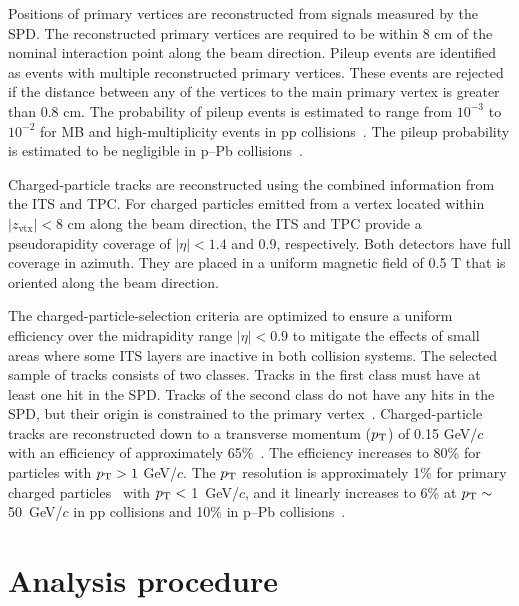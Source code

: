 Positions of primary vertices are reconstructed from signals measured by the SPD. The reconstructed primary vertices are required to be within 8 cm of the nominal interaction point along the beam direction. 
Pileup events are identified as events with multiple reconstructed primary vertices. These events are rejected if the distance between any of the vertices to the main primary vertex is greater than 0.8 cm.
The probability of pileup events is estimated to range from $10^{-3}$ to $10^{-2}$ for MB and high-multiplicity events in pp collisions~\cite{ALICE:2020swj}. The pileup probability is estimated to be negligible in p--Pb collisions~\cite{ALICE:2017svf}. 

Charged-particle tracks are reconstructed using the combined information from the ITS and TPC.
For charged particles emitted from a vertex located within $|z_\mathrm{vtx}|<8$ cm along the beam direction, the ITS and TPC provide a pseudorapidity coverage of $|\eta|<1.4$ and 0.9, respectively. Both detectors have full coverage in azimuth. They are placed in a uniform magnetic field of 0.5 T that is oriented along the beam direction.

The charged-particle-selection criteria are optimized to ensure a uniform efficiency over the midrapidity range $|\eta|<0.9$ to mitigate the effects of small areas where some ITS layers are inactive in both collision systems. The selected sample of tracks consists of two classes. Tracks in the first class must have at least one hit in the SPD. Tracks of the second class do not have any hits in the SPD, but their origin is constrained to the primary vertex~\cite{ALICE:2012eyl}. 
Charged-particle tracks are reconstructed down to a transverse momentum ($p_\mathrm{T}$) of 0.15 GeV/$c$ with an efficiency of approximately 65\%~\cite{Ivanov:2006yra}. The efficiency increases to 80\% for particles with $p_\mathrm{T}>1$ GeV/$c$. The $p_\mathrm{T}$ resolution is approximately 1\% for primary charged particles~\cite{ALICE-PUBLIC-2017-005} with $p_\mathrm{T}<$ 1~GeV/$c$, and it linearly increases to 6\% at $p_\mathrm{T}\sim$ 50~GeV/$c$ in pp collisions and 10\% in p--Pb collisions~\cite{ALICE:2018vuu}.


\section{Analysis procedure}
\label{sec:ana}
